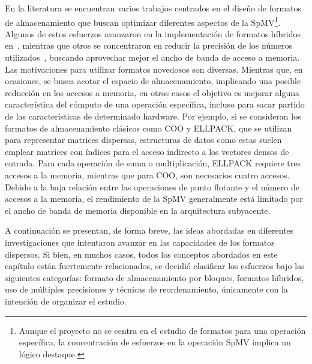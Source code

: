 En la literatura se encuentran varios trabajos centrados en el diseño de formatos de almacenamiento que buscan optimizar diferentes aspectos de la SpMV\footnote{Aunque el proyecto no se centra en el estudio de formatos para una operación específica, la concentración de esfuerzos en la operación SpMV implica un lógico destaque.}. Algunos de estos esfuerzos avanzaron en la implementación de formatos híbridos en~\cite{Maggioni2014}, mientras que otros se concentraron en reducir la precisión de los números utilizados~\cite{Xu2010}, buscando aprovechar mejor el ancho de banda de acceso a memoria. Las motivaciones para utilizar formatos novedosos son diversas. Mientras que, en ocasiones, se busca acotar el espacio de almacenamiento, implicando una posible reducción en los accesos a memoria, en otros casos el objetivo es mejorar alguna característica del cómputo de una operación específica, incluso para sacar partido de las características de determinado hardware. Por ejemplo, si se consideran los formatos de almacenamiento clásicos como COO y ELLPACK, que se utilizan para representar matrices dispersas, estructuras de datos como estas suelen emplear matrices con índices para el acceso indirecto a los vectores densos de entrada. Para cada operación de suma o multiplicación, ELLPACK requiere tres accesos a la memoria, mientras que para COO, son necesarios cuatro accesos. Debido a la baja relación entre las operaciones de punto flotante y el número de accesos a la memoria, el rendimiento de la SpMV generalmente está limitado por el ancho de banda de memoria disponible en la arquitectura subyacente.



A continuación se presentan, de forma breve, las ideas abordadas en diferentes investigaciones que intentaron avanzar en las capacidades de los formatos dispersos. %
Si bien, en muchos casos, todos los conceptos abordados en este capítulo están fuertemente relacionados, se decidió clasificar los esfuerzos bajo las siguientes categorías: formato de almacenamiento por bloques, formatos híbridos, uso de múltiples precisiones y técnicas de reordenamiento, únicamente con la intención de organizar el estudio. 


